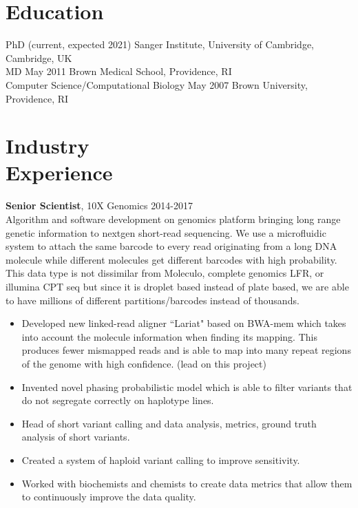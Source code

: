 \documentclass[margin]{res}
\begin{document}
 
\begin{resume} 
\section{Education} 

PhD (current, expected 2021) \hfill Sanger Institute, University of Cambridge, Cambridge, UK \\
MD May 2011 \hfill Brown Medical School, Providence, RI \\ 
Computer Science/Computational Biology May 2007 \hfill Brown University, Providence, RI 
\section{Industry \\Experience}

{\bf Senior Scientist}, 10X Genomics \hfill 2014-2017 \\
Algorithm and software development on genomics platform bringing long range genetic information to nextgen short-read sequencing. We use a microfluidic system to attach the same barcode to every read originating from a long DNA molecule while different molecules get different barcodes with high probability. This data type is not dissimilar from Moleculo, complete genomics LFR, or illumina CPT seq but since it is droplet based instead of plate based, we are able to have millions of different partitions/barcodes instead of thousands.
\begin{itemize}
\item Developed new linked-read aligner ``Lariat" based on BWA-mem which takes into account the molecule information when finding its mapping. This produces fewer mismapped reads and is able to map into many repeat regions of the genome with high confidence. (lead on this project)
\item Invented novel phasing probabilistic model which is able to filter variants that do not segregate correctly on haplotype lines. 
\item Head of short variant calling and data analysis, metrics, ground truth analysis of short variants.
\item Created a system of haploid variant calling to improve sensitivity. 
\item Worked with biochemists and chemists to create data metrics that allow them to continuously improve the data quality.
\end{itemize}



\end{resume}
\end{document}
